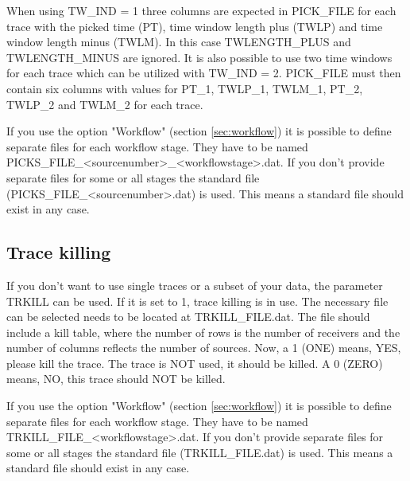 When using TW\_IND = 1 three columns are expected in PICK\_FILE for each trace with the picked time (PT), time window length plus (TWLP) and time window length minus (TWLM). In this case TWLENGTH\_PLUS and TWLENGTH\_MINUS are ignored. It is also possible to use two time windows for each trace which can be utilized with TW\_IND = 2. PICK\_FILE must then contain six columns with values for PT\_1, TWLP\_1, TWLM\_1, PT\_2, TWLP\_2 and TWLM\_2 for each trace.

If you use the option "Workflow" (section \ref{sec:workflow}) it is possible to define separate files for each workflow stage. They have to be named PICKS\_FILE\_<sourcenumber>\_<workflowstage>.dat. If you don't provide separate files for some or all stages the standard file (PICKS\_FILE\_<sourcenumber>.dat) is used. This means a standard file should exist in any case.

\subsection{Trace killing}
\label{sec:trace_killing}
{\color{blue}{\begin{verbatim}
"Trace killing" : "comment",
			"TRKILL" : "0",
			"TRKILL_FILE" : "./trace_kill/trace_kill",
			
			"TRKILL_OFFSET" : "0",
			"TRKILL_OFFSET_LOWER" : "20",
			"TRKILL_OFFSET_UPPER" : "100",
\end{verbatim}}}

{\color{red}{\begin{verbatim}
Default values are:
	TRKILL=0
\end{verbatim}}}

If you don't want to use single traces or a subset of your data, the parameter TRKILL can be used. If it is set to 1, trace killing is in use. The necessary file can be selected needs to be located at TRKILL\_FILE.dat. The file should include a kill table, where the number of rows is the number of receivers and the number of columns reflects the number of sources. Now, a 1 (ONE) means, YES, please kill the trace. The trace is NOT used, it should be killed. A 0 (ZERO) means, NO, this trace should NOT be killed. 

If you use the option "Workflow" (section \ref{sec:workflow}) it is possible to define separate files for each workflow stage. They have to be named TRKILL\_FILE\_<workflowstage>.dat. If you don't provide separate files for some or all stages the standard file (TRKILL\_FILE.dat) is used. This means a standard file should exist in any case.

